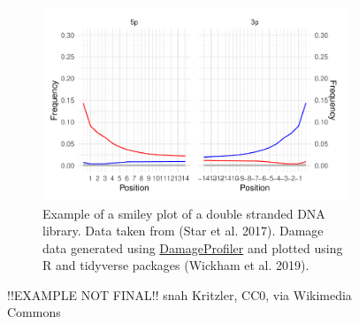 \documentclass[
  letterpaper,
  DIV=11,
  numbers=noendperiod]{scrreprt}
\begin{document}
\begin{figure}

\begin{minipage}[t]{0.50\linewidth}

{\centering 

\begin{figure}

{\centering \includegraphics{double-stranded_files/figure-pdf/fig-double-stranded-smiley-1.pdf}

}

\caption{\label{fig-double-stranded-smiley}Example of a smiley plot of a
double stranded DNA library. Data taken from (Star et al. 2017). Damage
data generated using \href{/intro.qmd}{DamageProfiler} and plotted using
R and tidyverse packages (Wickham et al. 2019).}

\end{figure}

}

\end{minipage}%
%
\begin{minipage}[t]{0.50\linewidth}

{\centering 


\caption{\label{fig-double-stranded-caricature}!!EXAMPLE NOT FINAL!!
snah Kritzler, CC0, via Wikimedia Commons}

}

\end{minipage}%

\end{figure}
\end{document}
